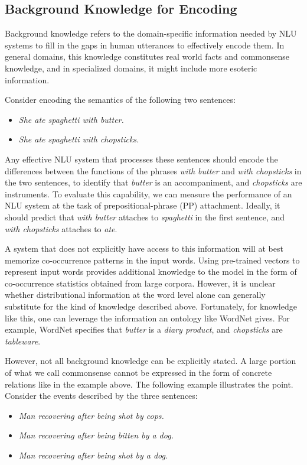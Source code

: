 \subsection{Background Knowledge for Encoding}
Background knowledge refers to the domain-specific information needed by NLU systems to fill in the gaps in human utterances to effectively encode them. In general domains,
this knowledge constitutes real world facts and commonsense knowledge, and in specialized domains,
it might include more esoteric information.

Consider encoding the semantics of the following two sentences:
\begin{itemize}
 \item[] \textit{She ate spaghetti with butter.}
 \item[] \textit{She ate spaghetti with chopsticks.}
\end{itemize}
Any effective NLU system that processes these sentences should encode the differences between the functions of the phrases \textit{with butter} and \textit{with chopsticks}
in the two sentences, to identify that \textit{butter} is an accompaniment, and \textit{chopsticks} are instruments. To evaluate this capability, we can measure
the performance of an NLU system at the task of prepositional-phrase (PP) attachment. Ideally, it should predict that \textit{with butter} attaches to
\textit{spaghetti} in the first sentence, and \textit{with chopsticks} attaches to \textit{ate}.

A system that does not explicitly have access to this information will at best memorize co-occurrence patterns in the input words.
Using pre-trained vectors to represent input words provides additional knowledge to the model in the
form of co-occurrence statistics obtained from large corpora. However, it is unclear whether distributional
information at the word level alone can generally substitute for the kind of knowledge described above. Fortunately, for knowledge like this, one can leverage the information an ontology like WordNet
gives. For example, WordNet specifies that \textit{butter} is a \textit{diary product}, and \textit{chopsticks} are \textit{tableware}.

However, not all background knowledge can be explicitly stated. A large portion of what we call
commonsense cannot be expressed in the form of concrete relations like in the example above.
The following example illustrates the point. Consider the events described by the three sentences:

\begin{itemize}
 \item[] \textit{Man recovering after being shot by cops.}
 \item[] \textit{Man recovering after being bitten by a dog.}
 \item[] \textit{Man recovering after being shot by a dog.}
\end{itemize}

